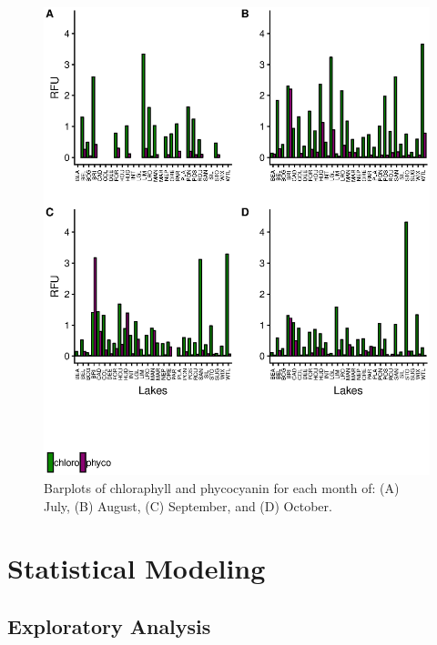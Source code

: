 \begin{figure}[!h]
	\includegraphics[width=\textwidth]{figures/floro}
	\caption{
Barplots of chloraphyll and phycocyanin	for each month of:
(A) July, 
(B) August,
(C) September, and
(D) October. 
}
	\label{fig:floro}
\end{figure}

\clearpage




\section{Statistical Modeling}
\subsection{Exploratory Analysis}

